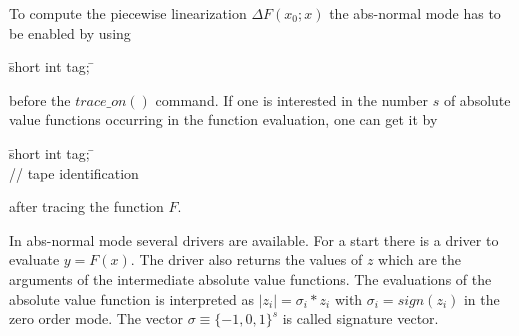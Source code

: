 To compute the piecewise linearization $\Delta F(x_0;x)$ the abs-normal mode has to be 
enabled by using
\begin{tabbing}
\hspace{0.5in}\={\sf short int tag;} \hspace{1.1in}\= \kill    %
\end{tabbing}
before the $\mathit{trace\_on}()$ command.
If one is interested in the number $s$ of absolute value functions occurring in the function 
evaluation, one can get it by
\begin{tabbing}
\hspace{0.5in}\={\sf short int tag;} \hspace{1.1in}\= \kill    %
\\
         \> // tape identification 
\end{tabbing}
after tracing the function $F$.

In abs-normal mode several drivers are available. For a start there is a driver 
to evaluate $y=F(x)$. The driver also returns the values of $z$ which are the arguments 
of the intermediate absolute value functions. The evaluations of the absolute value 
function is interpreted as $|z_i|=\sigma_i*z_i$ with $\sigma_i=sign(z_i)$ in the zero 
order mode. The vector $\sigma\equiv \{-1,0,1\}^s$ is called signature vector.

